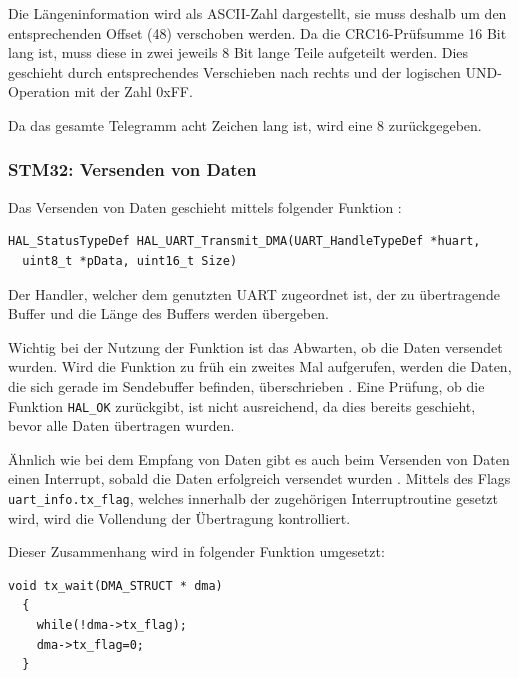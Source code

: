 Die Längeninformation wird als \ac{ASCII}-Zahl dargestellt, sie muss deshalb um den entsprechenden Offset (48) verschoben werden. Da die CRC16-Prüfsumme 16 Bit lang ist,
muss diese in zwei jeweils 8 Bit lange Teile aufgeteilt werden. Dies geschieht durch entsprechendes Verschieben nach rechts und der logischen UND-Operation mit der Zahl 
0xFF.

\smallskip

Da das gesamte Telegramm acht Zeichen lang ist, wird eine 8 zurückgegeben.



\subsubsection{STM32: Versenden von Daten}
\label{subsub: VersendenDat}

Das Versenden von Daten geschieht mittels folgender Funktion \citep{HAL_Description}:
\begin{lstlisting}[caption={\textit{Sendefunktion}}]
  HAL_StatusTypeDef HAL_UART_Transmit_DMA(UART_HandleTypeDef *huart,
  uint8_t *pData, uint16_t Size)
\end{lstlisting}

Der Handler, welcher dem genutzten \ac{UART} zugeordnet ist, der zu übertragende Buffer und die Länge des Buffers werden übergeben. 

\smallskip

Wichtig bei der Nutzung der Funktion ist das Abwarten, ob die Daten versendet wurden. Wird die Funktion zu früh ein zweites Mal aufgerufen, werden die Daten,
die sich gerade im Sendebuffer befinden, überschrieben \citep{HAL_Description}. Eine Prüfung, ob die Funktion \lstinline!HAL_OK! zurückgibt, ist nicht ausreichend,
da dies bereits geschieht, bevor alle Daten übertragen wurden.

\smallskip

Ähnlich wie bei dem Empfang von Daten gibt es auch beim Versenden von Daten einen Interrupt, sobald die Daten erfolgreich versendet wurden \citep{HAL_Description}. Mittels des
Flags \lstinline!uart_info.tx_flag!, welches innerhalb der zugehörigen Interruptroutine gesetzt wird, wird die Vollendung der Übertragung kontrolliert.

\smallskip

Dieser Zusammenhang wird in folgender Funktion umgesetzt:

\begin{lstlisting}[caption={\textit{Warten auf Versand}}]
  void tx_wait(DMA_STRUCT * dma)
  {
    while(!dma->tx_flag);						
    dma->tx_flag=0;								
  }
\end{lstlisting}

